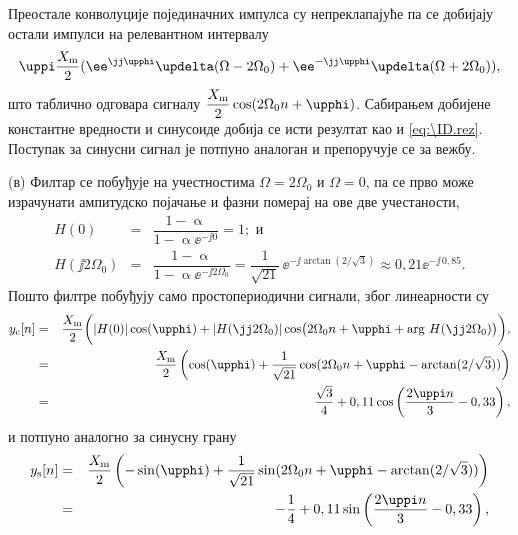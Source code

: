 Преостале конволуције појединачних импулса су непреклапајуће 
па се добијају остали импулси на релевантном интервалу
\begin{equation}
    \uppi \dfrac{X_{\rm m}}{2} ( \ee^{\jj\upphi} \updelta(\Omega - 2\Omega_0) + \ee^{-\jj\upphi} \updelta(\Omega + 2\Omega_0)  ),
\end{equation}
што таблично одговара сигналу $\dfrac{X_{\rm m}}{2} \cos(2\Omega_0 n + \upphi)$. Сабирањем добијене константне 
вредности и синусоиде добија се исти резултат као и \eqref{eq:\ID.rez}. Поступак за синусни сигнал је потпуно 
аналоган и препоручује се за вежбу. 

(в) Филтар се побуђује на учестностима $\Omega = 2\Omega_0$ и $\Omega = 0$, па се прво може израчунати 
ампитудско појачање и фазни померај на ове две учестаности,
\begin{eqnarray}
    H(0) &=& \dfrac{1 - \upalpha}{1 - \upalpha \ee^{-\jj 0}} = 1; \text{ и} \\ 
    H(\jj 2\Omega_0) &=& \dfrac{1 - \upalpha}{1 - \upalpha \ee^{-\jj2\Omega_0}} = 
    \dfrac{1}{\sqrt{21}} \, \ee^{-\jj\arctan\left(2/\sqrt 3\right)} \approx 
    0,21 \ee^{-\jj\,0,85}.
\end{eqnarray}
Пошто филтре побуђују само простопериодични сигнали, због линеарности су 
\begin{eqnarray}
    y_{\rm c}[n] 
    &=&
    \dfrac{X_{\rm m}}{2} \biggl( |H(0)| \cos(\upphi) 
    + |H(\jj 2 \Omega_0)| \cos \bigl(2\Omega_0 n + \upphi + \arg\,H(\jj2\Omega_0) \bigr) \biggr), \\
    &=&
    \dfrac{X_{\rm m}}{2} 
    \left(
        \cos(\upphi) + \dfrac{1}{\sqrt{21}} 
        \cos(2\Omega_0 n + \upphi -\arctan( {2}/{\sqrt 3}) )
    \right) \\
    &=& 
    \dfrac{\sqrt 3}{4} 
    + 
    0,11 \cos\left( \dfrac{2\uppi n}{3} - 0,33  \right),
\end{eqnarray}
и потпуно аналогно за синусну грану
\begin{eqnarray}
    y_{\rm s}[n] &=& 
    \dfrac{X_{\rm m}}{2} 
    \left(
        -\sin(\upphi) + \dfrac{1}{\sqrt{21}} 
        \sin(2\Omega_0 n + \upphi -\arctan( {2}/{\sqrt 3}) )
    \right) \\
    &=&
    -\dfrac{1}{4} 
    + 0,11 \sin\left( \dfrac{2\uppi n}{3} - 0,33  \right),
\end{eqnarray}

